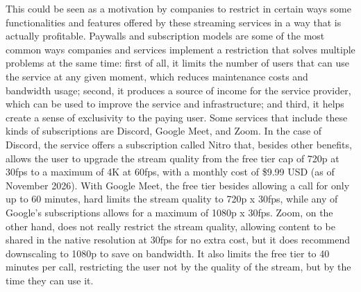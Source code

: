 \documentclass{article}
\begin{document}
This could be seen as a motivation by companies to restrict in certain ways some functionalities and features offered by these streaming services in a way that is 
actually profitable. Paywalls and subscription models are some of the most common ways companies and services implement a restriction that solves multiple problems at the
same time: first of all, it limits the number of users that can use the service at any given moment, which reduces maintenance costs and bandwidth usage; second, it produces
a source of income for the service provider, which can be used to improve the service and infrastructure; and third, it helps create a sense of exclusivity to the paying user. 
Some services that include these kinds of subscriptions are Discord, Google Meet, and Zoom. In the case of Discord, the service offers a subscription called Nitro that, besides
other benefits, allows the user to upgrade the stream quality from the free tier cap of 720p at 30fps to a maximum of 4K at 60fps, with a monthly cost of \$9.99 USD (as of November 2026). With Google Meet, 
the free tier besides allowing a call for only up to 60 minutes, hard limits the stream quality to 720p x 30fps, while any of Google's subscriptions allows for a maximum of 1080p x 30fps. Zoom, on the other hand, 
does not really restrict the stream quality, allowing content to be shared in the native resolution at 30fps for no extra cost, but it does recommend downscaling to 1080p to save on bandwidth. It also limits the free 
tier to 40 minutes per call, restricting the user not by the quality of the stream, but by the time they can use it.

\vspace{1em}
\end{document}
